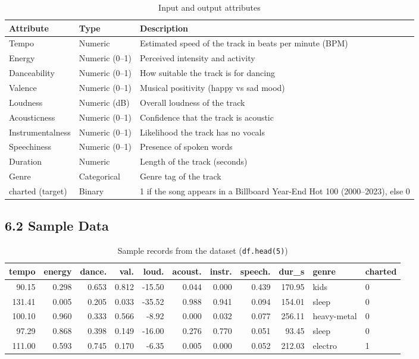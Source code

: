 \documentclass[11pt,a4paper]{article}
\begin{document}
\begin{table}[H]
\centering
\caption{Input and output attributes}
\begin{tabular}{llp{8cm}}
\toprule
\textbf{Attribute} & \textbf{Type} & \textbf{Description} \\
\midrule
Tempo & Numeric & Estimated speed of the track in beats per minute (BPM) \\
Energy & Numeric (0--1) & Perceived intensity and activity \\
Danceability & Numeric (0--1) & How suitable the track is for dancing \\
Valence & Numeric (0--1) & Musical positivity (happy vs sad mood) \\
Loudness & Numeric (dB) & Overall loudness of the track \\
Acousticness & Numeric (0--1) & Confidence that the track is acoustic \\
Instrumentalness & Numeric (0--1) & Likelihood the track has no vocals \\
Speechiness & Numeric (0--1) & Presence of spoken words \\
Duration & Numeric & Length of the track (seconds) \\
Genre & Categorical & Genre tag of the track \\
charted (target) & Binary & 1 if the song appears in a Billboard Year-End Hot 100 (2000--2023), else 0 \\
\bottomrule
\end{tabular}
\end{table}

\subsection*{6.2 Sample Data}
\begin{table}[H]
\centering
\caption{Sample records from the dataset (\texttt{df.head(5)})}
\scriptsize
\begin{tabular}{rrrrrrrrrll}
\toprule
tempo & energy & dance. & val. & loud. & acoust. & instr. & speech. & dur\_s & genre & charted \\
\midrule
90.15 & 0.298 & 0.653 & 0.812 & -15.50 & 0.044 & 0.000 & 0.439 & 170.95 & kids & 0 \\
131.41 & 0.005 & 0.205 & 0.033 & -35.52 & 0.988 & 0.941 & 0.094 & 154.01 & sleep & 0 \\
100.10 & 0.960 & 0.333 & 0.566 & -8.92 & 0.000 & 0.032 & 0.077 & 256.11 & heavy-metal & 0 \\
97.29 & 0.868 & 0.398 & 0.149 & -16.00 & 0.276 & 0.770 & 0.051 & 93.45 & sleep & 0 \\
111.00 & 0.593 & 0.745 & 0.170 & -6.35 & 0.005 & 0.000 & 0.052 & 212.03 & electro & 1 \\
\bottomrule
\end{tabular}
\end{table}
\end{document}
